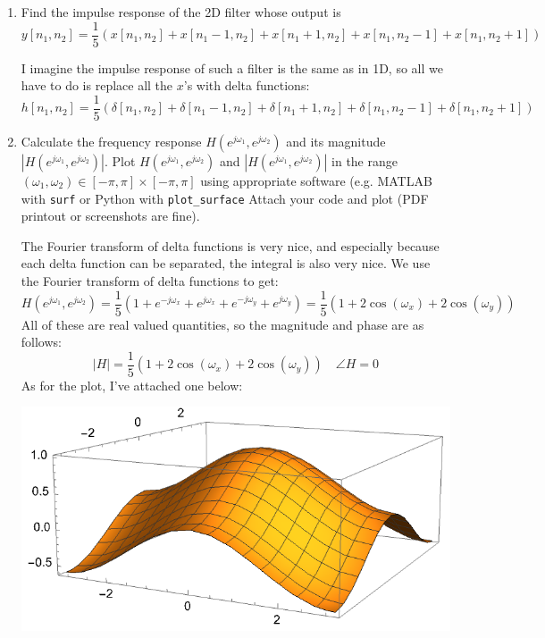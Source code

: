 \documentclass[10pt]{article}
\begin{document}
	\begin{enumerate}[label=\alph*)]
		\item Find the impulse response of the 2D filter whose output is
			\[
				y[n_1, n_2] = \frac{1}{5}(x[n_1, n_2] + x[n_1 - 1, n_2] + x[n_1 + 1, n_2] + 
				x[n_1, n_2 - 1] + x[n_1, n_2 + 1])
			\] 

			\begin{solution}
				I imagine the impulse response of such a filter is the same as in 1D, so all we have to do 
				is replace all the  \( x \)'s with delta functions:
				\[
					h[n_1, n_2] =  \frac{1}{5}(\delta[n_1, n_2] + \delta[n_1 - 1, n_2] + \delta[n_1 + 1, n_2] + 
				\delta[n_1, n_2 - 1] + \delta[n_1, n_2 + 1])
				\] 
			\end{solution}
		\item Calculate the frequency response \( H(e^{j \omega_1}, e^{j \omega_2}) \) and its 
			magnitude \( |H(e^{j \omega_1}, e^{j \omega_2})| \). Plot \( H(e^{j \omega_1}, e^{j \omega_2}) \) and 
			\( |H(e^{j \omega_1}, e^{j \omega_2})| \) in the range \( (\omega_1, \omega_2) \in 
			[-\pi, \pi] \times [-\pi, \pi]\) using appropriate software (e.g. MATLAB with \texttt{surf} or 
			Python with \texttt{plot\_surface} Attach your code and plot (PDF printout or 
			screenshots are fine). 

			\begin{solution}
				The Fourier transform of delta functions is very nice, and especially because each delta function 
				can be separated, the integral is also very nice. We use the Fourier transform of delta functions to 
				get:
				\[
				H(e^{j \omega_1}, e^{j \omega_2}) = 
				\frac{1}{5}\left( 1 + e^{-j \omega_x} + e^{j \omega_x}
				+ e^{-j \omega_y} + e^{j \omega_y}\right) = \frac{1}{5}\left( 1 + 2\cos(\omega_x) 
			+ 2\cos(\omega_y)\right) 
				\] 
				All of these are real valued quantities, so the magnitude and phase are as follows:
				\[
				|H| = \frac{1}{5}(1 + 2\cos(\omega_x) + 2\cos(\omega_y)) \quad \angle H = 0
				\] 
				As for the plot, I've attached one below:
				\begin{center}
					\includegraphics[scale=0.8]{q1b.png}
				\end{center}
			\end{solution}
	\end{enumerate}
	\pagebreak
\end{document}
